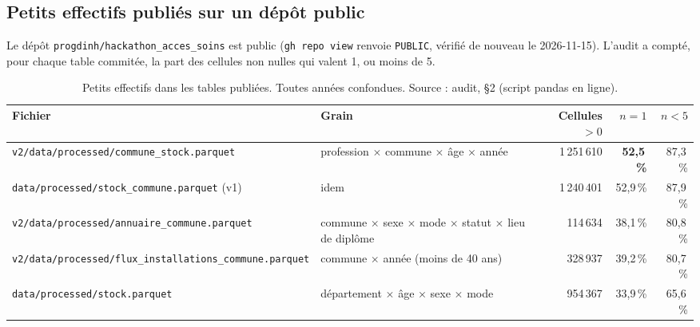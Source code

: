 \subsection{Petits effectifs publiés sur un dépôt public}\label{conf:petits}

Le dépôt \texttt{progdinh/\allowbreak{}hackathon\_\allowbreak{}acces\_\allowbreak{}soins} est public (\texttt{gh repo view} renvoie \texttt{PUBLIC}\mesure{}, vérifié de nouveau le 2026-11-15).
L'audit a compté, pour chaque table commitée, la part des cellules non nulles qui valent 1, ou moins de 5.

\begin{table}[htbp]\centering\small
\caption{Petits effectifs dans les tables publiées. Toutes années confondues. Source : audit, §2 (script pandas en ligne).}\label{conf:tab-petits}
\begin{tabular}{@{}p{}p{}rrr@{}}
\toprule Fichier & Grain & Cellules $>0$ & $n=1$ & $n<5$ \\ \midrule
\texttt{v2/\allowbreak{}data/\allowbreak{}processed/\allowbreak{}commune\_\allowbreak{}stock.parquet} & profession $\times$ commune $\times$ âge $\times$ année & 1\,251\,610\mesure{} & \textbf{52,5\mesure{}\,\%} & 87,3\mesure{}\,\% \\
\texttt{data/\allowbreak{}processed/\allowbreak{}stock\_\allowbreak{}commune.parquet} (v1) & idem & 1\,240\,401\mesure{} & 52,9\mesure{}\,\% & 87,9\mesure{}\,\% \\
\texttt{v2/\allowbreak{}data/\allowbreak{}processed/\allowbreak{}annuaire\_\allowbreak{}commune.parquet} & commune $\times$ sexe $\times$ mode $\times$ statut $\times$ lieu de diplôme & 114\,634\mesure{} & 38,1\mesure{}\,\% & 80,8\mesure{}\,\% \\
\texttt{v2/\allowbreak{}data/\allowbreak{}processed/\allowbreak{}flux\_\allowbreak{}installations\_\allowbreak{}commune.parquet} & commune $\times$ année (moins de 40 ans) & 328\,937\mesure{} & 39,2\mesure{}\,\% & 80,7\mesure{}\,\% \\
\texttt{data/\allowbreak{}processed/\allowbreak{}stock.parquet} & département $\times$ âge $\times$ sexe $\times$ mode & 954\,367\mesure{} & 33,9\mesure{}\,\% & 65,6\mesure{}\,\% \\ \bottomrule
\end{tabular}
\end{table}

